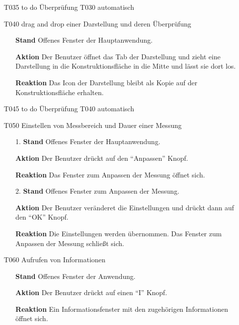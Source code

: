 \documentclass[parskip=full]{scrartcl}
\begin{document}
\begin{itemize}
\item[T035] to do Überprüfung T030 automatisch

\item[T040] drag and drop einer Darstellung und deren Überprüfung
\begin{itemize}

\item []\textbf{Stand} Offenes Fenster der Hauptanwendung.
\item []\textbf{Aktion} Der Benutzer öffnet das Tab der Darstellung und zieht eine Darstellung in die Konstruktionsfläche in die Mitte und lässt sie dort los.
\item []\textbf{Reaktion} Das Icon der Darstellung bleibt als Kopie auf der Konstruktionsfläche erhalten. 

\end{itemize}

\item[T045] to do Überprüfung T040 automatisch

\item[T050] Einstellen von Messbereich und Dauer einer Messung
\begin{itemize}

\item[1.]\textbf {Stand} Offenes Fenster der Hauptanwendung.
\item[]\textbf{Aktion} Der Benutzer drückt auf den "`Anpassen"' Knopf.
\item[]\textbf{Reaktion} Das Fenster zum Anpassen der Messung öffnet sich.

\item[2.]\textbf {Stand} Offenes Fenster zum Anpassen der Messung.
\item[]\textbf{Aktion} Der Benutzer veränderet die Einstellungen und drückt dann auf den "`OK"' Knopf.
\item[]\textbf{Reaktion} Die Einstellungen werden übernommen. Das Fenster zum Anpassen der Messung schließt sich.

\end{itemize}

\item[T060] Aufrufen von Informationen
\begin{itemize}
\item[]\textbf {Stand} Offenes Fenster der Anwendung.
\item[]\textbf{Aktion} Der Benutzer drückt auf einen "`I"' Knopf.
\item[]\textbf{Reaktion} Ein Informationsfenster mit den zugehörigen Informationen öffnet sich.
\end{itemize}


\end{itemize}
\end{document}
